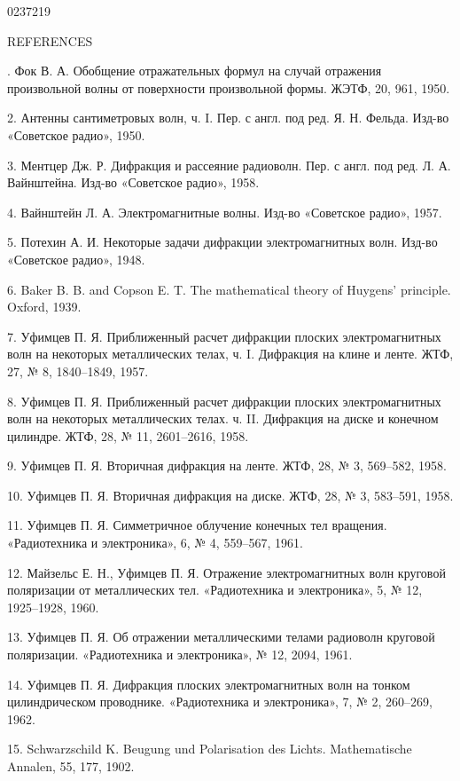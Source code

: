 \begin{scanpage}{0237}{219}
\begin{center}REFERENCES\end{center}
{\cyrillicfont\small
{}. Фок В. А. Обобщение отражательных формул на случай отражения произвольной волны от поверхности произвольной формы. ЖЭТФ, 20, 961, 1950.\par
2. Антенны сантиметровых волн, ч. I. Пер. с англ. под ред. Я. Н. Фельда. Изд-во «Советское радио», 1950.\par
3. Ментцер Дж. Р. Дифракция и рассеяние радиоволн. Пер. с англ. под ред. Л. А. Вайнштейна. Изд-во «Советское радио», 1958.\par
4. Вайнштейн Л. А. Электромагнитные волны. Изд-во «Советское радио», 1957.\par
5. Потехин А. И. Некоторые задачи дифракции электромагнитных волн. Изд-во «Советское радио», 1948.\par
6. Baker B. B. and Copson E. T. The mathematical theory of Huygens' principle. Oxford, 1939.\par
7. Уфимцев П. Я. Приближенный расчет дифракции плоских электромагнитных волн на некоторых металлических телах, ч. I. Дифракция на клине и ленте. ЖТФ, 27, № 8, 1840--1849, 1957.\par
8. Уфимцев П. Я. Приближенный расчет дифракции плоских электромагнитных волн на некоторых металлических телах. ч. II. Дифракция на диске и конечном цилиндре. ЖТФ, 28, № 11, 2601--2616, 1958.\par
9. Уфимцев П. Я. Вторичная дифракция на ленте. ЖТФ, 28, № 3, 569--582, 1958.\par
10. Уфимцев П. Я. Вторичная дифракция на диске. ЖТФ, 28, № 3, 583--591, 1958.\par
11. Уфимцев П. Я. Симметричное облучение конечных тел вращения. «Радиотехника и электроника», 6, № 4, 559--567, 1961.\par
12. Майзельс Е. Н., Уфимцев П. Я. Отражение электромагнитных волн круговой поляризации от металлических тел. «Радиотехника и электроника», 5, № 12, 1925--1928, 1960.\par
13. Уфимцев П. Я. Об отражении металлическими телами радиоволн круговой поляризации. «Радиотехника и электроника», № 12, 2094, 1961.\par
14. Уфимцев П. Я. Дифракция плоских электромагнитных волн на тонком цилиндрическом проводнике. «Радиотехника и электроника», 7, № 2, 260--269, 1962.\par
15. Schwarzschild K. Beugung und Polarisation des Lichts. Mathematische Annalen, 55, 177, 1902.\par
}
\end{scanpage}
